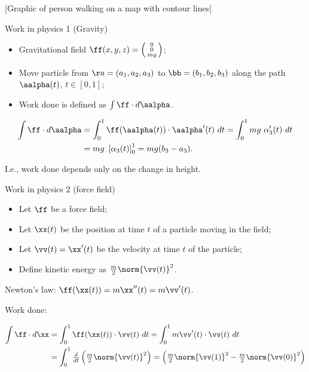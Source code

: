     [Graphic of person walking on a map with contour lines]





    {Work in physics 1 (Gravity)}


    \begin{itemize}
        \item Gravitational field \(\ff(x,y,z) = \left(\begin{smallmatrix}
                  0 \\ 0 \\ mg
              \end{smallmatrix}\right)\);
        \item Move particle from \(\aa=(a_1,a_2,a_3)\) to \(\bb=(b_1,b_2,b_3)\) along the path \(\aalpha(t)\), \(t\in [0,1]\);
        \item Work done is defined as \(\int \ff \cdot d\aalpha\).
    \end{itemize}

    \[
        \begin{aligned}
            \int \ff \cdot d\aalpha & = \int_0^1 \ff(\aalpha(t)) \cdot \aalpha'(t) \ dt
            = \int_0^1 mg \ \alpha_3'(t) \ dt                                               \\
                                    & = mg \ \left[ \alpha_3(t)\right]_0^1 = mg(b_3 - a_3).
        \end{aligned}
    \]

    {I.e.,} work done depends only on the change in height.




    {Work in physics 2 (force field)}

    \begin{itemize}
        \item Let \(\ff\) be a force field;
        \item Let \(\xx(t)\) be the position at time \(t\) of a particle moving in the field;
        \item Let \(\vv(t) = \xx'(t)\) be the velocity at time \(t\) of the particle;
        \item Define kinetic energy as \(\frac{m}{2} \norm{\vv(t)}^2\).
    \end{itemize}

    {Newton's law:}
    \(\ff(\xx(t)) = m\xx''(t) = m \vv'(t)\).

    {Work done:}
    
    \[
        \begin{aligned}
            \int \ff \cdot d\xx
             & = \int_0^1 \ff(\xx(t)) \cdot \vv(t) \ dt
            = \int_0^1 m\vv'(t) \cdot \vv(t) \ dt                                   \\
             & = \int_0^1 \tfrac{d}{dt} \left( \tfrac{m}{2} \norm{\vv(t)}^2 \right)
            = \left(  \tfrac{m}{2} \norm{\vv(1)}^2  -  \tfrac{m}{2} \norm{\vv(0)}^2   \right)
        \end{aligned}
    \]

